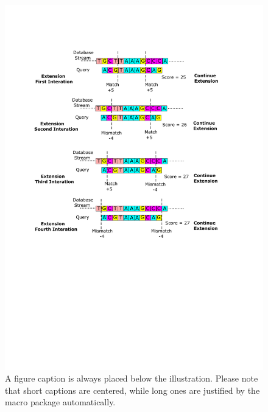\begin{figure}
\includegraphics[width=\textwidth]{Figures/Algorithm3.pdf}
\caption{A figure caption is always placed below the illustration.
Please note that short captions are centered, while long ones are
justified by the macro package automatically.} \label{fig1}
\end{figure}